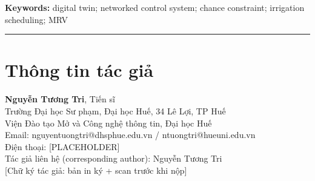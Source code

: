 \documentclass[10pt]{article}
\begin{document}
\noindent\textbf{Keywords:} digital twin; networked control system; chance constraint; irrigation scheduling; MRV

\vspace{1em}
\hrule
\vspace{0.5em}

\section*{Thông tin tác giả}

\noindent
\textbf{Nguyễn Tương Tri}, Tiến sĩ\\
Trường Đại học Sư phạm, Đại học Huế, 34 Lê Lợi, TP Huế\\
Viện Đào tạo Mở và Công nghệ thông tin, Đại học Huế\\
Email: nguyentuongtri@dhsphue.edu.vn / ntuongtri@hueuni.edu.vn\\
Điện thoại: [PLACEHOLDER]\\
Tác giả liên hệ (corresponding author): Nguyễn Tương Tri\\[6pt]
{\small [Chữ ký tác giả: bản in ký + scan trước khi nộp]}
\end{document}

